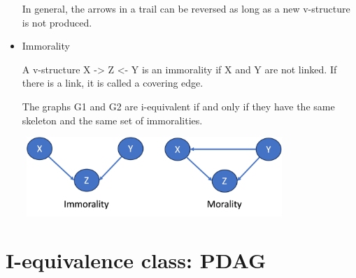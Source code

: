 \documentclass[11pt,a4paper]{report}
\begin{document}
\begin{itemize}
    In general, the arrows in a trail can be reversed as long as a new v-structure is not produced.

    \item Immorality
    
    A v-structure X -> Z <- Y is an immorality if X and Y are not linked. If there is a link, it is called a covering edge.

    The graphs G1 and G2 are i-equivalent if and only if they have the same skeleton and the same set of immoralities.

    \includegraphics[width = 10cm, height = 3cm]{morality.png}

\end{itemize}

\section{I-equivalence class: PDAG}
\end{document}
